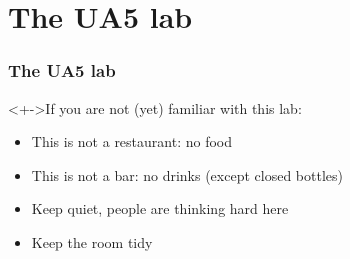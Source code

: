 \documentclass[11pt,a4paper,compress]{beamer}%
\begin{document}
\section{The UA5 lab}
\begin{frame}
\frametitle{The UA5 lab}

\begin{block}<+->{If you are not (yet) familiar with this lab:}

\begin{itemize}
\item This is not a restaurant: no food
\item This is not a bar: no drinks (except closed bottles)
\item Keep quiet, people are thinking hard here
\item Keep the room tidy
\end{itemize}
\end{block}
\end{frame}
\end{document}
